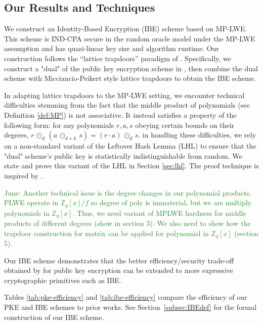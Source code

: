 \documentclass[11pt]{article}
\newcommand{\Z}{\mathbb{Z}}
\newcommand{\middleProduct}[1]{\, \odot_{#1} \,}
\newcommand{\jnote}[1]{\textcolor{ForestGreen}{June: {#1}}}
\begin{document}
\subsection{Our Results and Techniques} 

We construct an Identity-Based Encryption (IBE) scheme based on MP-LWE. This scheme is IND-CPA secure in the random oracle model under the MP-LWE assumption and has quasi-linear key size and algorithm runtime. Our construction follows the ``lattice trapdoors'' paradigm of \cite{trapdoor}. Specifically, we construct a "dual" of the public key encryption scheme in \cite{MPLWE}, then combine the dual scheme with Micciancio-Peikert style lattice trapdoors \cite{MP} to obtain the IBE scheme. 

In adapting lattice trapdoors to the MP-LWE setting, we encounter technical difficulties stemming from the fact that the middle product of polynomials (see Definition \ref{def:MP}) is not associative. It instead satisfies a property of the following form: for any polynomials $r,a,s$ obeying certain bounds on their degrees,  $r \middleProduct{d} (a \middleProduct{d+k} s ) = (r \cdot a) \middleProduct{d} s.$ in handling these difficulties, we rely on a non-standard variant of the Leftover Hash Lemma (LHL) to ensure that the "dual" scheme's public key is statistically indistinguishable from random. We state and prove this variant of the LHL in Section \ref{sec:lhl}. The proof technique is inspired by \cite{Mic12}.%

\jnote{Another technical issue is the degree changes in our polynomial products. PLWE operate in $\Z_q[x]/f$ so degree of poly is immaterial, but we are multiply polynomials in $\Z_q[x].$ Thus, we need variant of MPLWE hardness for middle products of different degrees (show in section 3). We also need to show how the trapdoor construction for matrix can be applied for polynomial in $\Z_q[x]$ (section 5).}


Our IBE scheme demonstrates that the better efficiency/security trade-off obtained by \cite{MPLWE} for public key encryption can be extended to more expressive cryptographic primitives such as IBE. 

Tables \ref{tab:pke-efficiency} and \ref{tab:ibe-efficiency} compare the efficiency of our PKE and IBE schemes to prior works. See Section~\ref{subsec:IBEdef} for the formal construction of our IBE scheme.
\end{document}
